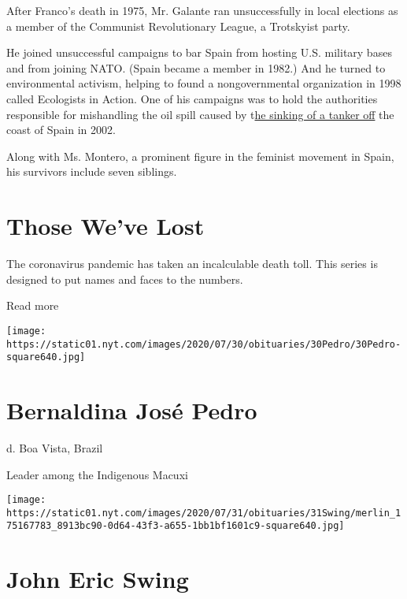 After Franco's death in 1975, Mr. Galante ran unsuccessfully in local
elections as a member of the Communist Revolutionary League, a
Trotskyist party.

He joined unsuccessful campaigns to bar Spain from hosting U.S. military
bases and from joining NATO. (Spain became a member in 1982.) And he
turned to environmental activism, helping to found a nongovernmental
organization in 1998 called Ecologists in Action. One of his campaigns
was to hold the authorities responsible for mishandling the oil spill
caused by
t\href{https://www.nytimes.com/2002/11/19/international/oil-tanker-sinks-off-spain-threatening-disaster.html}{he
sinking of a tanker off} the coast of Spain in 2002.

Along with Ms. Montero, a prominent figure in the feminist movement in
Spain, his survivors include seven siblings.

\href{https://www.nytimes.com/interactive/2020/obituaries/people-died-coronavirus-obituaries.html?action=click\&pgtype=Article\&state=default\&region=BELOW_MAIN_CONTENT\&context=covid_obits_promo}{}

\hypertarget{those-weve-lost}{%
\section{Those We've Lost}\label{those-weve-lost}}

The coronavirus pandemic has taken an incalculable death toll. This
series is designed to put names and faces to the numbers.

Read more

\texttt{[image: https://static01.nyt.com/images/2020/07/30/obituaries/30Pedro/30Pedro-square640.jpg]}

\hypertarget{bernaldina-josuxe9-pedro}{%
\section{Bernaldina José Pedro}\label{bernaldina-josuxe9-pedro}}

d. Boa Vista, Brazil

Leader among the Indigenous Macuxi

\texttt{[image: https://static01.nyt.com/images/2020/07/31/obituaries/31Swing/merlin\_175167783\_8913bc90-0d64-43f3-a655-1bb1bf1601c9-square640.jpg]}

\hypertarget{john-eric-swing}{%
\section{John Eric Swing}\label{john-eric-swing}}

